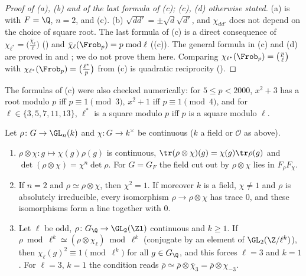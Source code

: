 \begin{proof}[Proof of (a), (b) and of the last formula of (c); (c), (d) otherwise stated]
(a) is  with $F=\Q$, $n=2$, and (c). (b) $\sqrt{dd'}=\pm\sqrt d\sqrt{d'}$, and $\chi_{dd'}$ does not depend on
the choice of square root. The last formula of (c) is a direct consequence of $\chi_{\ell^*}=\bigl(\frac{\bar\chi_\ell}\ell\bigr)$ () and
$\bar\chi_\ell(\Frob_p)=p\bmod\ell$ ((c)). The general formula in (c) and (d) are proved in  and ; we do not prove
them here. Comparing $\chi_{\ell^*}(\Frob_p)=\bigl(\frac p\ell\bigr)$ with $\chi_{\ell^*}(\Frob_p)=\bigl(\frac{\ell^*}p\bigr)$ from (c) is quadratic reciprocity ().
\end{proof}

The formulas of (c) were also checked numerically: for $5\le p<2000$, $x^2+3$ has a root modulo $p$ iff $p\equiv1\pmod 3$, $x^2+1$ iff $p\equiv1\pmod4$, and for
$\ell\in\{3,5,7,11,13\}$, $\ell^*$ is a square modulo $p$ iff $p$ is a square modulo $\ell$.

\begin{proposition}[Twists]\label{prop:galois:twist}
Let $\rho\colon G\to\GL_n(k)$ and $\chi\colon G\to k^\times$ be continuous ($k$ a field or $\mathcal{O}$ as above).
\begin{enumerate}[label=(\alph*)]
\item $\rho\otimes\chi\colon g\mapsto\chi(g)\rho(g)$ is continuous, $\tr(\rho\otimes\chi)(g)=\chi(g)\tr\rho(g)$ and $\det(\rho\otimes\chi)=\chi^n\det\rho$. For $G=G_F$ the field
cut out by $\rho\otimes\chi$ lies in $F_\rho F_\chi$.
\item If $n=2$ and $\rho\simeq\rho\otimes\chi$, then $\chi^2=1$. If moreover $k$ is a field, $\chi\ne1$ and $\rho$ is absolutely irreducible, every isomorphism
$\rho\to\rho\otimes\chi$ has trace $0$, and these isomorphisms form a line together with $0$.
\item Let $\ell$ be odd, $\rho\colon G_\Q\to\GL_2(\Zl)$ continuous and $k\ge1$. If $\rho\bmod\ell^k\simeq(\rho\otimes\chi_\ell)\bmod\ell^k$ (conjugate by an element of
$\GL_2(\Z/\ell^k)$), then $\chi_\ell(g)^2\equiv1\pmod{\ell^k}$ for all $g\in G_\Q$, and this forces $\ell=3$ and $k=1$. For $\ell=3$, $k=1$ the condition reads
$\bar\rho\simeq\bar\rho\otimes\bar\chi_3=\bar\rho\otimes\chi_{-3}$.
\end{enumerate}
\end{proposition}

